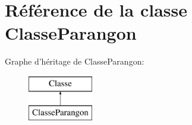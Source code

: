 \hypertarget{classClasseParangon}{\section{Référence de la classe Classe\-Parangon}
\label{classClasseParangon}
}
Graphe d'héritage de Classe\-Parangon\-:\begin{figure}[H]
\begin{center}
\leavevmode
\includegraphics[height=2.000000cm]{classClasseParangon}
\end{center}
\end{figure}
